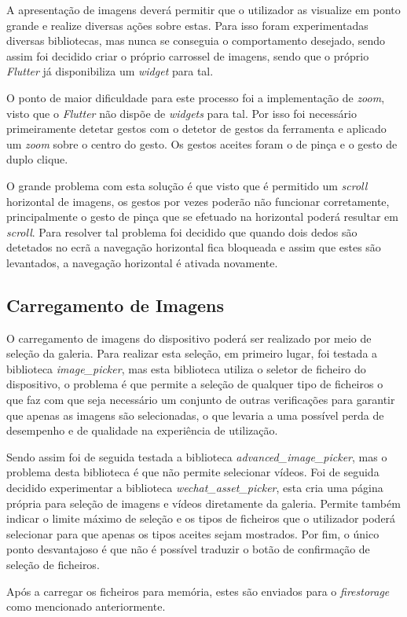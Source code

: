 A apresentação de imagens deverá permitir que o utilizador as visualize em ponto grande e realize diversas ações sobre estas. Para isso foram experimentadas diversas bibliotecas, mas nunca se conseguia o comportamento desejado, sendo assim foi decidido criar o próprio carrossel de imagens, sendo que o próprio \textit{Flutter} já disponibiliza um \textit{widget} para tal.

O ponto de maior dificuldade para este processo foi a implementação de \textit{zoom}, visto que o \textit{Flutter} não dispõe de \textit{widgets} para tal. Por isso foi necessário primeiramente detetar gestos com o detetor de gestos da ferramenta e aplicado um \textit{zoom} sobre o centro do gesto. Os gestos aceites foram o de pinça e o gesto de duplo clique.

O grande problema com esta solução é que visto que é permitido um \textit{scroll} horizontal de imagens, os gestos por vezes poderão não funcionar corretamente, principalmente o gesto de pinça que se efetuado na horizontal poderá resultar em \textit{scroll}. Para resolver tal problema foi decidido que quando dois dedos são detetados no ecrã a navegação horizontal fica bloqueada e assim que estes são levantados, a navegação horizontal é ativada novamente.

\subsection{Carregamento de Imagens}

O carregamento de imagens do dispositivo poderá ser realizado por meio de seleção da galeria. Para realizar esta seleção, em primeiro lugar, foi testada a biblioteca \textit{image\_picker}, mas esta biblioteca utiliza o seletor de ficheiro do dispositivo, o problema é que permite a seleção de qualquer tipo de ficheiros o que faz com que seja necessário um conjunto de outras verificações para garantir que apenas as imagens são selecionadas, o que levaria a uma possível perda de desempenho e de qualidade na experiência de utilização.

Sendo assim foi de seguida testada a biblioteca \textit{advanced\_image\_picker}, mas o problema desta biblioteca é que não permite selecionar vídeos. Foi de seguida decidido experimentar a biblioteca \textit{wechat\_asset\_picker}, esta cria uma página própria para seleção de imagens e vídeos diretamente da galeria. Permite também indicar o limite máximo de seleção e os tipos de ficheiros que o utilizador poderá selecionar para que apenas os tipos aceites sejam mostrados. Por fim, o único ponto desvantajoso é que não é possível traduzir o botão de confirmação de seleção de ficheiros.

Após a carregar os ficheiros para memória, estes são enviados para o \textit{firestorage} como mencionado anteriormente.